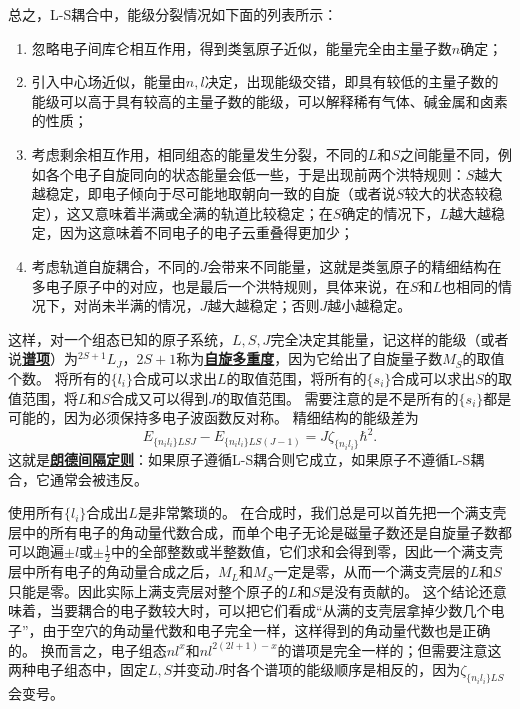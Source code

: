 \documentclass[UTF8, a4paper]{ctexart}
\newcommand*{\concept}[1]{\underline{\textbf{#1}}}
\begin{document}
总之，L-S耦合中，能级分裂情况如下面的列表所示：
\begin{enumerate}
    \item 忽略电子间库仑相互作用，得到类氢原子近似，能量完全由主量子数$n$确定；
    \item 引入中心场近似，能量由$n, l$决定，出现能级交错，即具有较低的主量子数的能级可以高于具有较高的主量子数的能级，可以解释稀有气体、碱金属和卤素的性质；
    \item 考虑剩余相互作用，相同组态的能量发生分裂，不同的$L$和$S$之间能量不同，例如各个电子自旋同向的状态能量会低一些，于是出现前两个洪特规则：$S$越大越稳定，即电子倾向于尽可能地取朝向一致的自旋（或者说$S$较大的状态较稳定），这又意味着半满或全满的轨道比较稳定；在$S$确定的情况下，$L$越大越稳定，因为这意味着不同电子的电子云重叠得更加少；
    \item 考虑轨道自旋耦合，不同的$J$会带来不同能量，这就是类氢原子的精细结构在多电子原子中的对应，也是最后一个洪特规则，具体来说，在$S$和$L$也相同的情况下，对尚未半满的情况，$J$越大越稳定；否则$J$越小越稳定。
\end{enumerate}
这样，对一个组态已知的原子系统，$L, S, J$完全决定其能量，记这样的能级（或者说\concept{谱项}）为$^{2S+1} L_J$，$2S+1$称为\concept{自旋多重度}，因为它给出了自旋量子数$M_S$的取值个数。
将所有的$\{l_i\}$合成可以求出$L$的取值范围，将所有的$\{s_i\}$合成可以求出$S$的取值范围，将$L$和$S$合成又可以得到$J$的取值范围。
需要注意的是不是所有的$\{s_i\}$都是可能的，因为必须保持多电子波函数反对称。
精细结构的能级差为
\begin{equation}
    E_{\{n_i l_i\} LSJ} - E_{\{n_i l_i\} LS(J-1)} = J \zeta_{\{n_i l_i\}} \hbar^2.
    \label{eq:lande-gapping}
\end{equation}
这就是\concept{朗德间隔定则}：如果原子遵循L-S耦合则它成立，如果原子不遵循L-S耦合，它通常会被违反。

使用所有$\{l_i\}$合成出$L$是非常繁琐的。
在合成时，我们总是可以首先把一个满支壳层中的所有电子的角动量代数合成，而单个电子无论是磁量子数还是自旋量子数都可以跑遍$\pm l$或$\pm \frac{1}{2}$中的全部整数或半整数值，它们求和会得到零，因此一个满支壳层中所有电子的角动量合成之后，$M_L$和$M_S$一定是零，从而一个满支壳层的$L$和$S$只能是零。因此实际上满支壳层对整个原子的$L$和$S$是没有贡献的。
这个结论还意味着，当要耦合的电子数较大时，可以把它们看成“从满的支壳层拿掉少数几个电子”，由于空穴的角动量代数和电子完全一样，这样得到的角动量代数也是正确的。
换而言之，电子组态$nl^x$和$nl^{2(2l+1)-x}$的谱项是完全一样的；但需要注意这两种电子组态中，固定$L,S$并变动$J$时各个谱项的能级顺序是相反的，因为$\zeta_{\{n_i l_i\}LS}$会变号。
\end{document}
